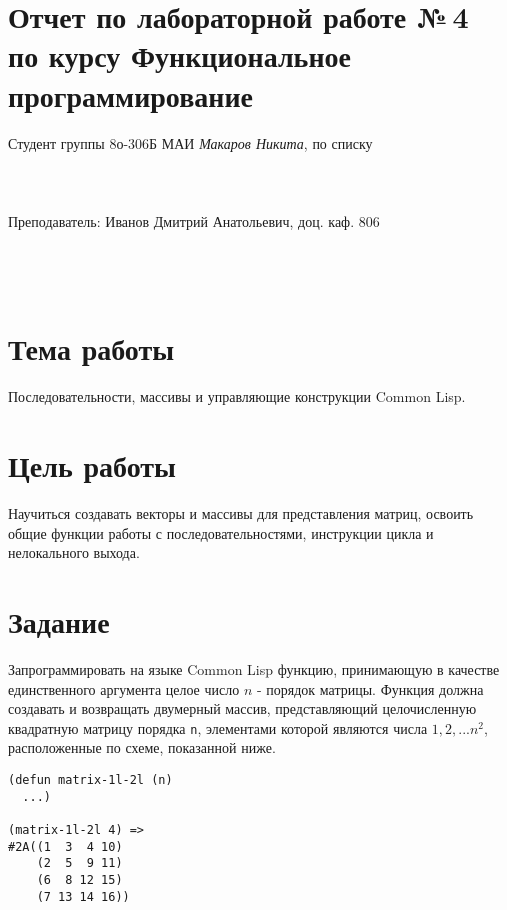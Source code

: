 \documentclass[a4paper, 12pt]{article}
\begin{document}
\section*{Отчет по лабораторной работе №\,4
\\по курсу \guillemotleft  Функциональное программирование\guillemotright}

\begin{flushright}
Студент группы 8о-306Б МАИ \textit{Макаров Никита},  по списку \\
 \\
 \\
\ \\
Преподаватель: Иванов Дмитрий Анатольевич, доц. каф. 806 \\
 \\
 \\
 \\

\end{flushright}


\section{Тема работы}
Последовательности, массивы и управляющие конструкции Common Lisp.

\section{Цель работы}
Научиться создавать векторы и массивы для представления матриц, освоить общие функции работы с последовательностями, инструкции цикла и нелокального выхода.

\section{Задание}
Запрограммировать на языке Common Lisp функцию, принимающую в качестве единственного аргумента целое число $n$ - порядок матрицы. Функция должна создавать и возвращать двумерный массив, представляющий целочисленную квадратную матрицу порядка {\tt n}, элементами которой являются числа $1, 2, ... n^2$, расположенные по схеме, показанной ниже.

\begin{lstlisting}
(defun matrix-1l-2l (n)
  ...)

(matrix-1l-2l 4) =>
#2A((1  3  4 10)
    (2  5  9 11)
    (6  8 12 15)
    (7 13 14 16))
\end{lstlisting}
\end{document}
